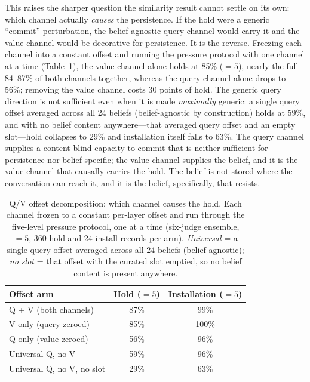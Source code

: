 This raises the sharper question the similarity result cannot settle on its own: which
channel actually \emph{causes} the persistence. If the hold were a generic ``commit''
perturbation, the belief-agnostic query channel would carry it and the value channel would
be decorative for persistence. It is the reverse. Freezing each channel into a constant
offset and running the pressure protocol with one channel at a time
(Table~\ref{tab:qv-decomp}), the value channel alone holds at 85\% (\(=5\)), nearly the full
84--87\% of both channels together, whereas the query channel alone drops to 56\%; removing
the value channel costs \(30\) points of hold. The generic
query direction is not sufficient even when it is made \emph{maximally} generic: a single
query offset averaged across all 24 beliefs (belief-agnostic by construction) holds at 59\%,
and with no belief content anywhere---that averaged query offset and an empty slot---hold
collapses to 29\% and installation itself falls to 63\%. The query channel supplies a
content-blind capacity to commit that is neither sufficient for persistence nor belief-specific;
the value channel supplies the belief, and it is the value channel that causally carries the
hold. The belief is not stored where the conversation can reach it, and it is the belief,
specifically, that resists.

\begin{table}[t]
\centering
\caption{Q/V offset decomposition: which channel causes the hold. Each channel frozen to a
constant per-layer offset and run through the five-level pressure protocol, one at a time
(six-judge ensemble, \(=5\), 360 hold and 24 install records per arm). \emph{Universal} = a
single query offset averaged across all 24 beliefs (belief-agnostic); \emph{no slot} = that
offset with the curated slot emptied, so no belief content is present anywhere.}
\label{tab:qv-decomp}
\small
\begin{tabular}{lcc}
\toprule
Offset arm & Hold (\(=5\)) & Installation (\(=5\)) \\
\midrule
Q + V (both channels) & 87\% & 99\% \\
V only (query zeroed) & 85\% & 100\% \\
Q only (value zeroed) & 56\% & 96\% \\
Universal Q, no V & 59\% & 96\% \\
Universal Q, no V, no slot & 29\% & 63\% \\
\bottomrule
\end{tabular}
\end{table}

